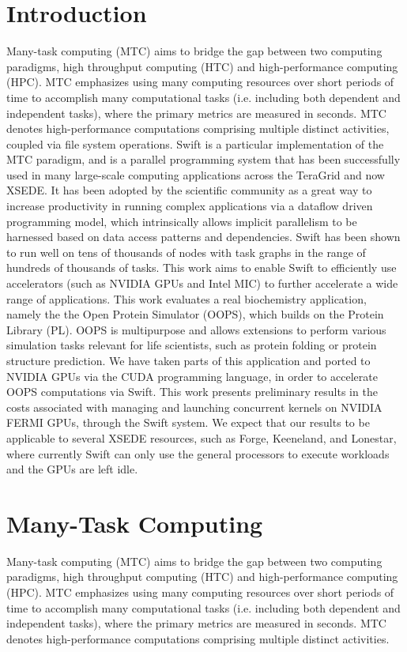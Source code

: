 \documentclass[conference]{IEEEtran}
\begin{document}
\section{Introduction}
Many-task computing (MTC) aims to bridge the gap between two computing paradigms, high throughput computing (HTC) and high-performance computing (HPC). MTC emphasizes using many computing resources over short periods of time to accomplish many computational tasks (i.e. including both dependent and independent tasks), where the primary metrics are measured in seconds. MTC denotes high-performance computations comprising multiple distinct activities, coupled via file system operations. Swift is a particular implementation of the MTC paradigm, and is a parallel programming system that has been successfully used in many large-scale computing applications across the TeraGrid and now XSEDE. It has been adopted by the scientific community as a great way to increase productivity in running complex applications via a dataflow driven programming model, which intrinsically allows implicit parallelism to be harnessed based on data access patterns and dependencies. Swift has been shown to run well on tens of thousands of nodes with task graphs in the range of hundreds of thousands of tasks. This work aims to enable Swift to efficiently use accelerators (such as NVIDIA GPUs and
Intel MIC) to further accelerate a wide range of applications. This work evaluates a real biochemistry application, namely the the Open Protein Simulator (OOPS), which builds on the Protein Library (PL). OOPS is multipurpose and allows extensions to perform various simulation tasks relevant for life scientists, such as protein folding or protein structure prediction. We have taken parts of this application and ported to NVIDIA GPUs via the CUDA programming language, in order to accelerate OOPS computations via Swift. This work presents preliminary results in the costs associated with managing and launching concurrent kernels on NVIDIA FERMI GPUs, through the Swift system. We expect that our results to be applicable to several XSEDE resources, such as Forge, Keeneland, and Lonestar, where currently Swift can only use the general processors to execute workloads and the GPUs are left idle.


\cite{kriederGCASR12}

\section{Many-Task Computing}
Many-task computing (MTC) aims to bridge the gap between two computing paradigms, high throughput computing (HTC) and high-performance computing (HPC). MTC emphasizes using many computing resources over short periods of time to accomplish many computational tasks (i.e. including both dependent and independent tasks), where the primary metrics are measured in seconds. MTC denotes high-performance computations comprising multiple distinct activities.
\end{document}
